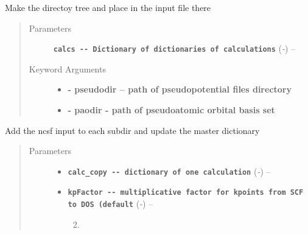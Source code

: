 \documentclass[letterpaper,10pt,english]{sphinxmanual}
\begin{document}
\begin{fulllineitems}
\label{scfuj:scfuj.maketree}
Make the directoy tree and place in the input file there
\begin{quote}\begin{description}
\item[{Parameters}] \leavevmode
\textbf{\texttt{calcs -{-} Dictionary of dictionaries of calculations}} (\emph{-}) -- 

\item[{Keyword Arguments}] \leavevmode\begin{itemize}
\item {} 
\textbf{- pseudodir   -- path of pseudopotential files directory}

\item {} 
\textbf{- paodir       - path of pseudoatomic orbital basis set}

\end{itemize}

\end{description}\end{quote}

\end{fulllineitems}


\begin{fulllineitems}
\label{scfuj:scfuj.nscf_nosym_noinv}
Add the ncsf input to each subdir and update the master dictionary
\begin{quote}\begin{description}
\item[{Parameters}] \leavevmode\begin{itemize}
\item {} 
\textbf{\texttt{calc\_copy -{-} dictionary of one calculation}} (\emph{-}) -- 

\item {} 
\textbf{\texttt{kpFactor -{-} multiplicative factor for kpoints from SCF to DOS (default}} (\emph{-}) -- \begin{enumerate}
\setcounter{enumi}{1}
\item {} 
\end{enumerate}


\end{itemize}

\end{description}\end{quote}

\end{fulllineitems}
\end{document}
